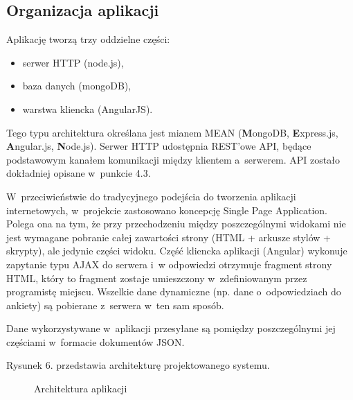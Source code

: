\documentclass[12pt,a4paper,notitlepage]{article}
\begin{document}
\subsection{Organizacja aplikacji}
Aplikację tworzą trzy oddzielne części:
\begin{itemize}
\item serwer HTTP (node.js),
\item baza danych (mongoDB),
\item warstwa kliencka (AngularJS).
\end{itemize}
Tego typu architektura określana jest mianem MEAN (\textbf{M}ongoDB, \textbf{E}xpress.js, \newline \textbf{A}ngular.js, \textbf{N}ode.js).
Serwer HTTP udostępnia REST'owe API, będące podstawowym kanałem komunikacji między klientem a~serwerem. API zostało dokładniej opisane w~punkcie 4.3.
\par W~przeciwieństwie do tradycyjnego podejścia do tworzenia aplikacji internetowych, w~projekcie zastosowano koncepcję Single Page Application. Polega ona na tym, że przy przechodzeniu między poszczególnymi widokami nie jest wymagane pobranie całej zawartości strony (HTML + arkusze stylów + skrypty), ale jedynie części widoku. Część kliencka aplikacji (Angular) wykonuje zapytanie typu AJAX do serwera i~w odpowiedzi otrzymuje fragment strony HTML, który to fragment zostaje umieszczony w~zdefiniowanym przez programistę miejscu. Wszelkie dane dynamiczne (np. dane o~odpowiedziach do ankiety) są pobierane z~serwera w~ten sam sposób.
\par Dane wykorzystywane w~aplikacji przesyłane są pomiędzy poszczególnymi jej częściami w~formacie dokumentów JSON.
\par Rysunek 6. przedstawia architekturę projektowanego systemu.

\begin{figure}[H]
\begin{center}
\caption{Architektura aplikacji}
\end{center}
\end{figure}
\end{document}
